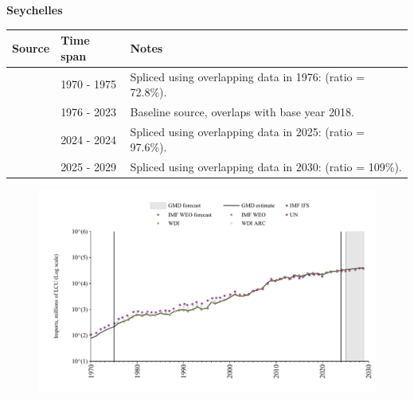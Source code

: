 \documentclass[12pt,a4paper,landscape]{article}
\begin{document}
\begin{adjustbox}{max totalsize={\paperwidth}{\paperheight},center}
\begin{minipage}[t][\textheight][t]{\textwidth}
\vspace*{0.5cm}
{}
\begin{center}
{\Large\bfseries Seychelles}
\end{center}
\vspace{0.5cm}
\begin{table}[H]
\centering
\small
\begin{tabular}{|l|l|l|}
\hline
\textbf{Source} & \textbf{Time span} & \textbf{Notes} \\
\hline
\rowcolor{white}\cite{UN}& 1970 - 1975 &Spliced using overlapping data in 1976: (ratio = 72.8\%).\\
\rowcolor{lightgray}\cite{WDI}& 1976 - 2023 &Baseline source, overlaps with base year 2018.\\
\rowcolor{white}\cite{IMF_IFS}& 2024 - 2024 &Spliced using overlapping data in 2025: (ratio = 97.6\%).\\
\rowcolor{lightgray}\cite{IMF_WEO_forecast}& 2025 - 2029 &Spliced using overlapping data in 2030: (ratio = 109\%).\\
\hline
\end{tabular}
\end{table}
\begin{figure}[H]
\centering
\includegraphics[width=\textwidth,height=0.6\textheight,keepaspectratio]{graphs/SYC_imports.pdf}
\end{figure}
\end{minipage}
\end{adjustbox}
\end{document}
